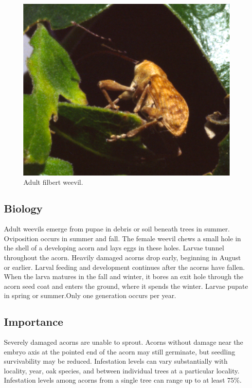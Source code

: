 \documentclass[
]{book}
\begin{document}
\begin{figure}

{\centering \includegraphics[width=0.8\linewidth]{images/Insect-acorn/Cur_ad_PR} 

}

\caption{Adult filbert weevil.}\label{fig:CurAdPR}
\end{figure}

\subsection*{Biology}\label{biology}

Adult weevils emerge from pupae in debris or soil beneath trees in summer. Oviposition occurs in summer and fall. The female weevil chews a small hole in the shell of a developing acorn and lays eggs in these holes. Larvae tunnel throughout the acorn. Heavily damaged acorns drop early, beginning in August or earlier. Larval feeding and development continues after the acorns have fallen. When the larva matures in the fall and winter, it bores an exit hole through the acorn seed coat and enters the ground, where it spends the winter. Larvae pupate in spring or summer.Only one generation occurs per year.

\subsection*{Importance}\label{importance}

Severely damaged acorns are unable to sprout. Acorns without damage near the embryo axis at the pointed end of the acorn may still germinate, but seedling survivability may be reduced. Infestation levels can vary substantially with locality, year, oak species, and between individual trees at a particular locality. Infestation levels among acorns from a single tree can range up to at least 75\%.
\end{document}
